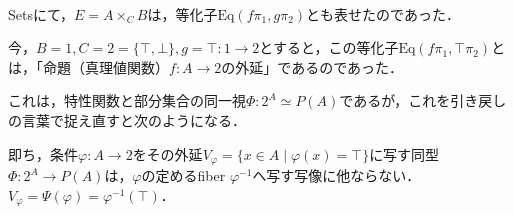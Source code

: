 \documentclass[uplatex, dvipdfmx]{jsarticle}
\begin{document}
\begin{example}　

    \begin{center}
    \end{center}
    Setsにて，$E=A\times_CB$は，等化子$\mathrm{Eq}(f\pi_1,g\pi_2)$とも表せたのであった．
    \begin{center}
    \end{center}
    今，$B=1,C=2=\{\top,\bot\},g=\top:1\to 2$とすると，この等化子$\mathrm{Eq}(f\pi_1,\top\pi_2)$とは，「命題（真理値関数）$f:A\to 2$の外延」であるのであった．
    \begin{center}
    \end{center}
    これは，特性関数と部分集合の同一視$\Phi:2^A\simeq P(A)$であるが，これを引き戻しの言葉で捉え直すと次のようになる．
    \begin{center}
    \end{center}
    即ち，条件$\varphi:A\to 2$をその外延$V_\varphi=\{x\in A\mid \varphi(x)=\top\}$に写す同型$\Phi:2^A\to P(A)$は，$\varphi$の定めるfiber $\varphi^{-1}$へ写す写像に他ならない．$V_\varphi = \Psi(\varphi) = \varphi^{-1}(\top)$．


\end{example}
\end{document}
